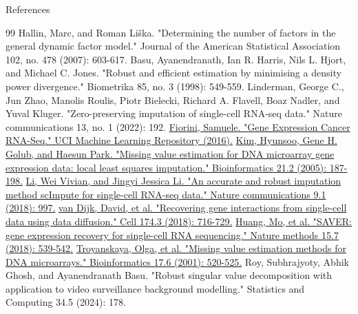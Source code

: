 \documentclass{beamer}
\begin{document}
\begingroup
{}
\begin{frame}{References}
    \tiny
    \begin{thebibliography}{99}
     Hallin, Marc, and Roman Liška. "Determining the number of factors in the general dynamic factor model." Journal of the American Statistical Association 102, no. 478 (2007): 603-617.
     Basu, Ayanendranath, Ian R. Harris, Nils L. Hjort, and Michael C. Jones. "Robust and efficient estimation by minimising a density power divergence." Biometrika 85, no. 3 (1998): 549-559.
     Linderman, George C., Jun Zhao, Manolis Roulis, Piotr Bielecki, Richard A. Flavell, Boaz Nadler, and Yuval Kluger. "Zero-preserving imputation of single-cell RNA-seq data." Nature communications 13, no. 1 (2022): 192.
     \href{https://doi.org/10.24432/C5R88H}{Fiorini, Samuele. "Gene Expression Cancer RNA-Seq." UCI Machine Learning Repository (2016).}
     \href{https://doi.org/10.1093/bioinformatics/bth499}{Kim, Hyunsoo, Gene H. Golub, and Haesun Park. "Missing value estimation for DNA microarray gene expression data: local least squares imputation." Bioinformatics 21.2 (2005): 187-198.}
     \href{https://doi.org/10.1038/s41467-018-03405-7}{Li, Wei Vivian, and Jingyi Jessica Li. "An accurate and robust imputation method scImpute for single-cell RNA-seq data." Nature communications 9.1 (2018): 997.}
     \href{https://doi.org/10.1016/j.cell.2018.05.061}{van Dijk, David, et al. "Recovering gene interactions from single-cell data using data diffusion." Cell 174.3 (2018): 716-729.}
     \href{https://doi.org/10.1038/s41592-018-0033-z}{Huang, Mo, et al. "SAVER: gene expression recovery for single-cell RNA sequencing." Nature methods 15.7 (2018): 539-542.}
     \href{https://doi.org/10.1093/bioinformatics/17.6.520}{Troyanskaya, Olga, et al. "Missing value estimation methods for DNA microarrays." Bioinformatics 17.6 (2001): 520-525.}
     Roy, Subhrajyoty, Abhik Ghosh, and Ayanendranath Basu. "Robust singular value decomposition with application to video surveillance background modelling." Statistics and Computing 34.5 (2024): 178.

\end{thebibliography}
\end{frame}
\end{document}
